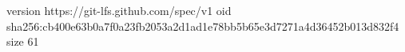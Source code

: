version https://git-lfs.github.com/spec/v1
oid sha256:cb400e63b0a7f0a23fb2053a2d1ad1e78bb5b65e3d7271a4d36452b013d832f4
size 61
